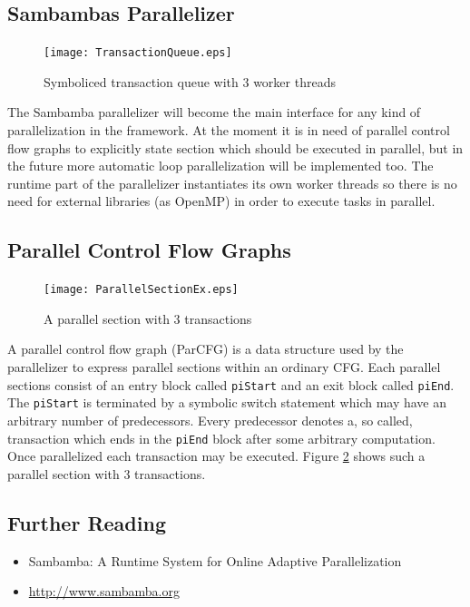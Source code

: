 \clearpage
\subsection{Sambambas Parallelizer}
\begin{figure}
  \centering
  \texttt{[image: TransactionQueue.eps]}
  \caption{Symboliced transaction queue with 3 worker threads}
  \label{fig:TransactionQueue}  
\end{figure}
The Sambamba parallelizer will become the main interface for any kind of 
parallelization in the framework. At the moment it is in need of parallel control
flow graphs to explicitly state section which should be executed in parallel, but
in the future more automatic loop parallelization will be implemented too. 
The runtime part of the parallelizer instantiates its own worker threads so there
is no need for external libraries (as OpenMP) in order to execute tasks in parallel. \\


\subsection{Parallel Control Flow Graphs}
\begin{figure}
  \centering
  \vspace*{-5mm}
  \begin{minipage}[c][0.37\width]{\textwidth}
  \texttt{[image: ParallelSectionEx.eps]}
  \end{minipage}
  \caption{A parallel section with 3 transactions}
  \label{fig:ParallelSectionEx}  
\end{figure}
A parallel control flow graph (ParCFG) is a data structure used by the
parallelizer to express parallel sections within an ordinary CFG. 
Each parallel sections consist of an entry block called \texttt{piStart} and
an exit block called \texttt{piEnd}. The \texttt{piStart} is terminated by a 
symbolic switch statement which may have an arbitrary number of predecessors. 
Every predecessor denotes a, so called, transaction which ends in the 
\texttt{piEnd} block after some arbitrary computation. 
Once parallelized each transaction may be executed.
Figure \ref{fig:ParallelSectionEx} shows such a parallel section with 3 
transactions. 


\subsection*{Further Reading}
\begin{itemize}
  \item Sambamba: A Runtime System for Online Adaptive Parallelization \cite{DBLP:conf/cc/StreitHZH12}  
  \item \url{http://www.sambamba.org} \nocite{StreitHZH12:Online}
\end{itemize}



